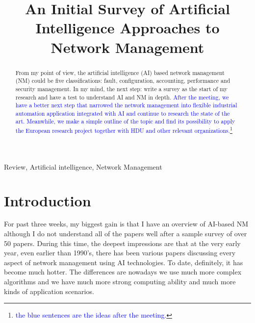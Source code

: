\documentclass[journal,UTF8]{IEEEtran}
\begin{document}
\title{An Initial Survey of Artificial Intelligence Approaches to Network Management}

\maketitle

% 
% 
\begin{abstract}
From my point of view, the artificial intelligence (AI) based network management (NM) could be five classifications: fault, configuration, accounting, performance and security management. In my mind, the next step: write a survey as the start of my research and have a test to understand AI and NM in depth. \textcolor{blue}{After the meeting, we have a better next step that narrowed the network management into flexible industrial automation application integrated with AI and continue to research the state of the art. Meanwhile, we make a simple outline of the topic and find its possibility to apply the European research project together with HDU and other relevant organizations.\footnote{\textcolor{blue}{the blue sentences are the ideas after the meeting.}}}  
 

\end{abstract}

\begin{IEEEkeywords}
Review, Artificial intelligence, Network Management
\end{IEEEkeywords}

%
\IEEEpeerreviewmaketitle

\section{Introduction}
For past three weeks, my biggest gain is that I have an overview of AI-based NM although I do not understand all of the papers well after a sample survey of over 50 papers. During this time, the deepest impressions are that at the very early year, even earlier than 1990's, there has been various papers discussing every aspect of network management using AI technologies. To date, definitely, it has become much hotter. The differences are nowadays we use much more complex algorithms and we have much more strong computing ability and much more kinds of application scenarios. 
\end{document}
